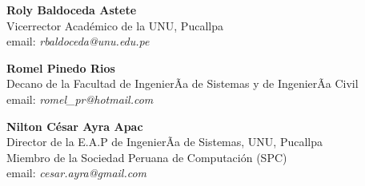 \begin{center}
\textbf{Roly Baldoceda Astete}\\
Vicerrector Académico de la UNU, Pucallpa\\
email: \textit{rbaldoceda@unu.edu.pe}\\
\end{center}

\begin{center}
\textbf{Romel Pinedo Rios}\\
Decano de la Facultad de IngenierÃ­a de Sistemas y de IngenierÃ­a Civil\\
email: \textit{romel\_pr@hotmail.com}\\
\end{center}

\begin{center}
\textbf{Nilton César Ayra Apac}\\
Director de la E.A.P de IngenierÃ­a de Sistemas, UNU, Pucallpa\\
Miembro de la Sociedad Peruana de Computación (SPC)\\
email: \textit{cesar.ayra@gmail.com}\\
\end{center}

\newpage
